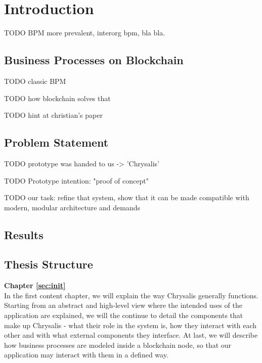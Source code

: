 %
\chapter{Introduction}
\label{sec:intro}

TODO BPM more prevalent, interorg bpm, bla bla.

\section{Business Processes on Blockchain}
\label{sec:intro:motivation}

TODO classic BPM

TODO how blockchain solves that

TODO hint at christian's paper

\section{Problem Statement}
\label{sec:intro:problem}

TODO prototype was handed to us -> 'Chrysalis'

TODO Prototype intention: "proof of concept"

TODO our task: refine that system, show that it can be made compatible with modern, modular architecture and demands

\section{Results}
\label{sec:intro:results}



\section{Thesis Structure}
\label{sec:intro:structure}

\textbf{Chapter \ref{sec:init}} \\[0.2em]
In the first content chapter, we will explain the way Chrysalis generally functions. Starting from an abstract and high-level view where the intended uses of the application are explained, we will the continue to detail the components that make up Chrysalis - what their role in the system is, how they interact with each other and with what external components they interface. At last, we will describe how business processes are modeled inside a blockchain node, so that our application may interact with them in a defined way.

